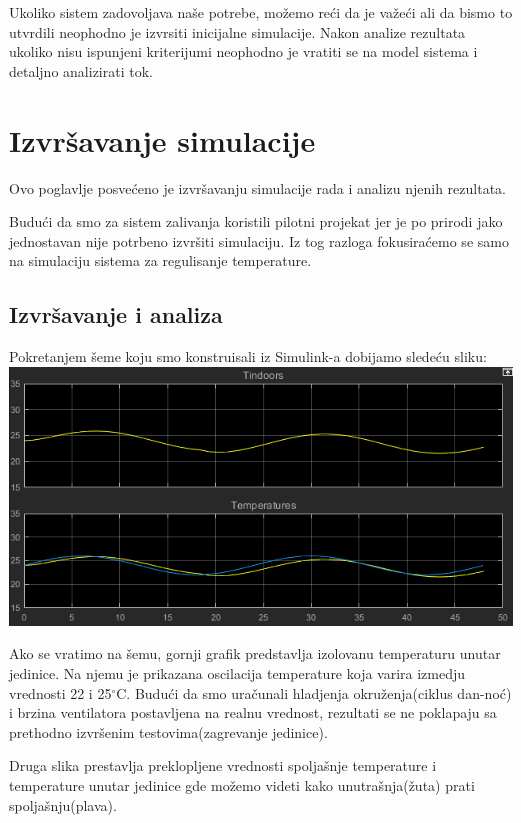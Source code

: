 \documentclass[a4paper,11pt]{book}
\begin{document}
Ukoliko sistem zadovoljava naše potrebe, možemo reći da je važeći ali da bismo to utvrdili neophodno je izvrsiti inicijalne simulacije. Nakon analize rezultata ukoliko nisu ispunjeni kriterijumi neophodno je vratiti se na model sistema i detaljno analizirati tok. 


\chapter{Izvršavanje simulacije}

Ovo poglavlje posvećeno je izvršavanju simulacije rada i analizu njenih rezultata. 

Budući da smo za sistem zalivanja koristili pilotni projekat jer je po prirodi jako jednostavan nije potrbeno izvršiti simulaciju. Iz tog razloga fokusiraćemo se samo na simulaciju sistema za regulisanje temperature. 

\section{Izvršavanje i analiza}

Pokretanjem šeme koju smo konstruisali iz Simulink-a dobijamo sledeću sliku:\\

\includegraphics[width=\textwidth]{done.png}

Ako se vratimo na šemu, gornji grafik predstavlja izolovanu temperaturu unutar jedinice. Na njemu je prikazana oscilacija temperature koja varira izmedju vrednosti 22 i 25$^\circ$C. Budući da smo uračunali hladjenja okruženja(ciklus dan-noć) i brzina ventilatora postavljena na realnu vrednost, rezultati se ne poklapaju sa prethodno izvršenim testovima(zagrevanje jedinice). 

Druga slika prestavlja preklopljene vrednosti spoljašnje temperature i temperature unutar jedinice gde možemo videti kako unutrašnja(žuta) prati spoljašnju(plava).
\end{document}
